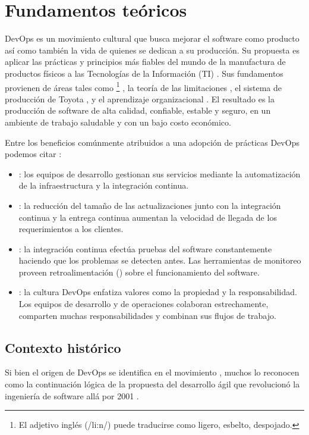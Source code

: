 %
%
%
\chapter{Fundamentos teóricos}
%
DevOps es un movimiento cultural que busca mejorar el software como
producto así como también la vida de quienes se dedican a su
producción. Su propuesta es aplicar las prácticas y principios más
fiables del mundo de la manufactura de productos físicos a las
Tecnologías de la Información (TI) \cite{handbook}. Sus fundamentos
provienen de áreas tales como \footnote{ El adjetivo inglés
   (/li:n/) puede traducirse como ligero, esbelto, despojado.}
\cite{lean}, la teoría de las limitaciones \cite{thegoal}, el sistema
de producción de Toyota \cite{toyota}, y el aprendizaje organizacional
\cite{fifth}. El resultado es la producción de software de alta
calidad, confiable, estable y seguro, en un ambiente de trabajo
saludable y con un bajo costo económico.

Entre los beneficios comúnmente atribuidos a una adopción de prácticas
DevOps podemos citar \cite{awsdevops}:
%
\begin{itemize}
\item {}: los equipos de desarrollo gestionan sus
  servicios mediante la automatización de la infraestructura y la
  integración continua.
\item {}: la reducción del tamaño de las
  actualizaciones junto con la integración continua y la entrega
  continua aumentan la velocidad de llegada de los requerimientos a
  los clientes.
\item {}: la integración continua efectúa pruebas
  del software constantemente haciendo que los problemas se detecten
  antes. Las herramientas de monitoreo proveen retroalimentación
  () sobre el funcionamiento del software.
\item {}: la cultura DevOps enfatiza valores como
  la propiedad y la responsabilidad. Los equipos de desarrollo y de
  operaciones colaboran estrechamente, comparten muchas
  responsabilidades y combinan sus flujos de trabajo.
\end{itemize}
%
%
\section{Contexto histórico}
%
Si bien el origen de DevOps se identifica en el movimiento ,
muchos lo reconocen como la continuación lógica de la propuesta del
desarrollo ágil que revolucionó la ingeniería de software allá por
2001 \cite{agilemanifesto}.

